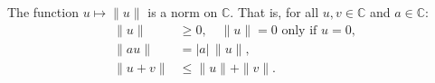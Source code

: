 The function $u \mapsto \|u\|$ is a norm on $\mathbb{C}$. That is, for all $u, v \in \mathbb{C}$ and $a \in \mathbb{C}$:
\begin{align}
\|u\| &\geq 0, \quad \|u\| = 0 \text{ only if } u = 0, \\
\|a u\| &= |a| \, \|u\|, \\
\|u + v\| &\leq \|u\| + \|v\|.
\end{align}
